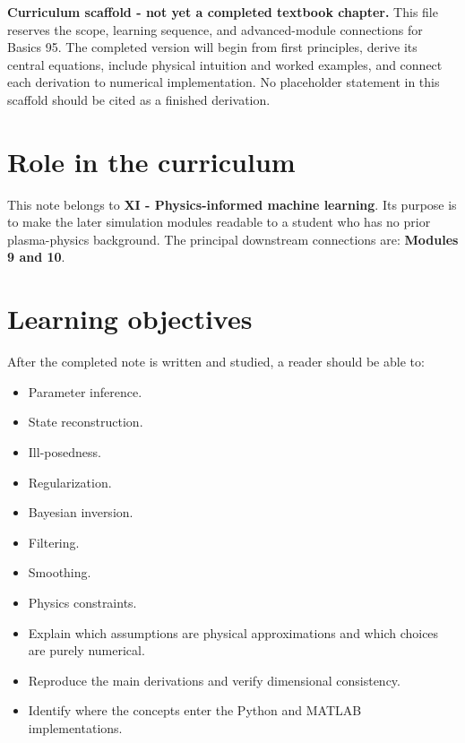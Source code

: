 \documentclass[11pt]{article}
\begin{document}

\begin{overviewbox}
\textbf{Curriculum scaffold - not yet a completed textbook chapter.} This file reserves the scope, learning sequence, and advanced-module connections for Basics 95. The completed version will begin from first principles, derive its central equations, include physical intuition and worked examples, and connect each derivation to numerical implementation. No placeholder statement in this scaffold should be cited as a finished derivation.
\end{overviewbox}

\ProjectTOC

\section{Role in the curriculum}
This note belongs to \textbf{XI - Physics-informed machine learning}. Its purpose is to make the later simulation modules readable to a student who has no prior plasma-physics background. The principal downstream connections are: \textbf{Modules 9 and 10}.

\section{Learning objectives}
After the completed note is written and studied, a reader should be able to:
\begin{itemize}[leftmargin=1.6em]
\item Parameter inference.
\item State reconstruction.
\item Ill-posedness.
\item Regularization.
\item Bayesian inversion.
\item Filtering.
\item Smoothing.
\item Physics constraints.
\item Explain which assumptions are physical approximations and which choices are purely numerical.
\item Reproduce the main derivations and verify dimensional consistency.
\item Identify where the concepts enter the Python and MATLAB implementations.
\end{itemize}
\end{document}
